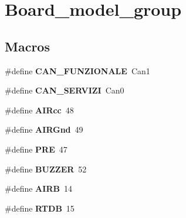 \hypertarget{group___board__model__group}{}\section{Board\+\_\+model\+\_\+group}
\label{group___board__model__group}
\subsection*{Macros}
\begin{DoxyCompactItemize}
\item 
\mbox{\label{group___board__model__group_gaea8caf3e051442ba02c4e44a59602796}} 
\#define {\bfseries C\+A\+N\+\_\+\+F\+U\+N\+Z\+I\+O\+N\+A\+LE}~Can1
\item 
\mbox{\label{group___board__model__group_ga8d2f70cd4c07aafe94fd9944121922d9}} 
\#define {\bfseries C\+A\+N\+\_\+\+S\+E\+R\+V\+I\+ZI}~Can0
\item 
\mbox{\label{group___board__model__group_ga15003800bba3fb64e770c6a920613419}} 
\#define {\bfseries A\+I\+Rcc}~48
\item 
\mbox{\label{group___board__model__group_gab421578437964f5c645163739a0803e7}} 
\#define {\bfseries A\+I\+R\+Gnd}~49
\item 
\mbox{\label{group___board__model__group_ga349316092037fdd0773335fab4e15ee8}} 
\#define {\bfseries P\+RE}~47
\item 
\mbox{\label{group___board__model__group_ga145103118f6d9d1129aa4509cf214a13}} 
\#define {\bfseries B\+U\+Z\+Z\+ER}~52
\item 
\mbox{\label{group___board__model__group_ga78a99c4f7bcb7723d7bf21810c4ce09b}} 
\#define {\bfseries A\+I\+RB}~14
\item 
\mbox{\label{group___board__model__group_ga1bcd7461cf494d3235f792bf3d814923}} 
\#define {\bfseries R\+T\+DB}~15
\item 
\mbox{\label{group___board__model__group_gacd9448edb89c378d843fc3cb93a098d3}} 

\end{DoxyCompactItemize}
